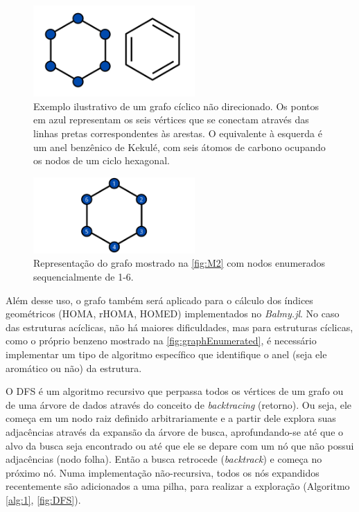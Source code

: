 \newpage

\begin{figure}[htb]
	\caption{\label{fig:M2} Exemplo ilustrativo de um grafo cíclico não direcionado. Os pontos em azul representam os seis vértices que se conectam através das linhas pretas correspondentes às arestas. O equivalente à esquerda é um anel benzênico de Kekulé, com seis átomos de carbono ocupando os nodos de um ciclo hexagonal.}
	\begin{center}
		\includegraphics[width=0.55\textwidth]{images/grafo(2).png}
	\end{center}
\end{figure}

\begin{figure}[htb]
\caption{\label{fig:graphEnumerated}Representação do grafo mostrado na \autoref{fig:M2} com nodos enumerados sequencialmente de 1-6.}
	\begin{center}
		\includegraphics[width=0.55\textwidth]{images/graphEnumerated.png}
	\end{center}
\end{figure}

Além desse uso, o grafo também será aplicado para o cálculo dos índices geométricos (\gls{HOMA}, \gls{rHOMA}, \gls{HOMED}) implementados no \textit{Balmy.jl}. No caso das estruturas acíclicas, não há maiores dificuldades, mas para estruturas cíclicas, como o próprio benzeno mostrado na \autoref{fig:graphEnumerated}, é necessário implementar um tipo de algoritmo específico que identifique o anel (seja ele aromático ou não) da estrutura.

O \gls{DFS}\autocite{Knuth1997-jf, Goodrich2001-pd} é um algoritmo recursivo que perpassa todos os vértices de um grafo ou de uma árvore de dados através do conceito de \textit{backtracing} (retorno). Ou seja, ele começa em um nodo raiz definido arbitrariamente e a partir dele explora suas adjacências através da expansão da árvore de busca, aprofundando-se até que o alvo da busca seja encontrado ou até que ele se depare com um nó que não possui adjacências (nodo folha). Então a busca retrocede (\textit{backtrack}) e começa no próximo nó. Numa implementação não-recursiva, todos os nós expandidos recentemente são adicionados a uma pilha, para realizar a exploração (Algoritmo \ref{alg:1}, \autoref{fig:DFS}).




